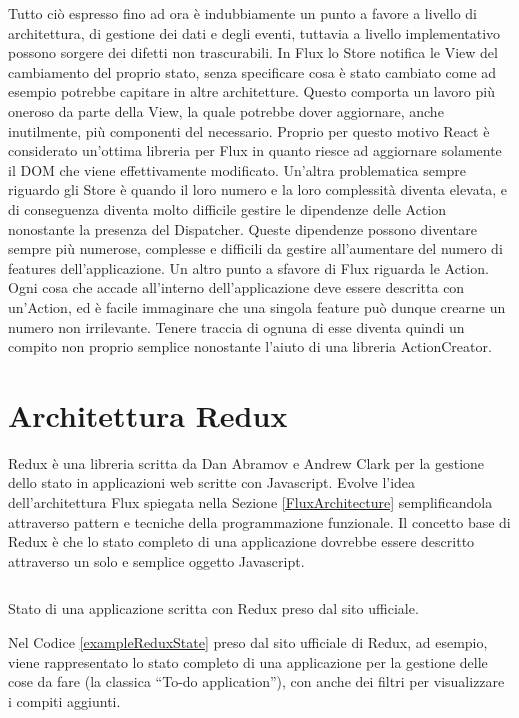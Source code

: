 Tutto ciò espresso fino ad ora è indubbiamente un punto a favore a livello di architettura, di gestione dei dati e degli eventi, tuttavia a livello implementativo possono sorgere dei difetti non trascurabili.
In Flux lo Store notifica le View del cambiamento del proprio stato, senza specificare cosa è stato cambiato come ad esempio potrebbe capitare in altre architetture. Questo comporta un lavoro più oneroso da parte della View, la quale potrebbe dover aggiornare, anche inutilmente, più componenti del necessario. Proprio per questo motivo React è considerato un'ottima libreria per Flux in quanto riesce ad aggiornare solamente il DOM che viene effettivamente modificato.
Un'altra problematica sempre riguardo gli Store è quando il loro numero e la loro complessità diventa elevata, e di conseguenza diventa molto difficile gestire le dipendenze delle Action nonostante la presenza del Dispatcher. Queste dipendenze possono diventare sempre più numerose, complesse e difficili da gestire all'aumentare del numero di features dell'applicazione.
Un altro punto a sfavore di Flux riguarda le Action. Ogni cosa che accade all'interno dell'applicazione deve essere descritta con un'Action, ed è facile immaginare che una singola feature può dunque crearne un numero non irrilevante. Tenere traccia di ognuna di esse diventa quindi un compito non proprio semplice nonostante l'aiuto di una libreria ActionCreator.

\section{Architettura Redux}
\label{ReduxArchitecture}

Redux è una libreria scritta da Dan Abramov e Andrew Clark per la gestione dello stato in applicazioni web scritte con Javascript. Evolve l'idea dell'architettura Flux spiegata nella Sezione \ref{FluxArchitecture} semplificandola attraverso pattern e tecniche della programmazione funzionale. Il concetto base di Redux è che lo stato completo di una applicazione dovrebbe essere descritto attraverso un solo e semplice oggetto Javascript.

\begin{listing}[ht]
\inputminted{javascript}{sources/exampleReduxState.js}
\caption{Stato di una applicazione scritta con Redux preso dal sito ufficiale.} 
\label{exampleReduxState} 
\end{listing}

Nel Codice \ref{exampleReduxState} preso dal sito ufficiale di Redux, ad esempio, viene rappresentato lo stato completo di una applicazione per la gestione delle cose da fare (la classica “To-do application”), con anche dei filtri per visualizzare i compiti aggiunti.

